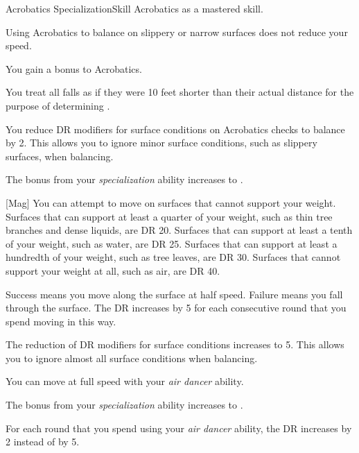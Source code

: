     \begin{feat}{Acrobatics Specialization}{Skill}
        \featpre Acrobatics as a mastered skill.

         Using Acrobatics to balance on slippery or narrow surfaces does not reduce your speed.

         You gain a  bonus to Acrobatics.

         You treat all falls as if they were 10 feet shorter than their actual distance for the purpose of determining \glossterm{}.

         You reduce DR modifiers for surface conditions on Acrobatics checks to balance by 2.
        This allows you to ignore minor surface conditions, such as slippery surfaces, when balancing.

         The bonus from your \textit{specialization} ability increases to .

        [Mag] You can attempt to move on surfaces that cannot support your weight.
        Surfaces that can support at least a quarter of your weight, such as thin tree branches and dense liquids, are DR 20.
        Surfaces that can support at least a tenth of your weight, such as water, are DR 25.
        Surfaces that can support at least a hundredth of your weight, such as tree leaves, are DR 30.
        Surfaces that cannot support your weight at all, such as air, are DR 40.

        Success means you move along the surface at half speed.
        Failure means you fall through the surface.
        The DR increases by 5 for each consecutive round that you spend moving in this way.

         The reduction of DR modifiers for surface conditions increases to 5.
        This allows you to ignore almost all surface conditions when balancing.

         You can move at full speed with your \textit{air dancer} ability.

         The bonus from your \textit{specialization} ability increases to .

         For each round that you spend using your \textit{air dancer} ability, the DR increases by 2 instead of by 5.
    \end{feat}

